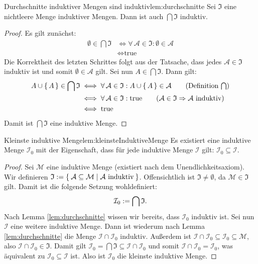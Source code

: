 \documentclass{article}
\begin{document}
\begin{lemma}{Durchschnitte induktiver Mengen sind induktiv}{lem:durchschnitte}
Sei $\mathfrak{I}$ eine nichtleere Menge induktiver Mengen. Dann ist auch
$\bigcap\mathfrak{I}$ induktiv.
\end{lemma}
\begin{proof}
 Es gilt
zun\"achst:
\begin{align*}
    \emptyset \in \bigcap\mathfrak{I}
    & \iff
    \forall\, \mathcal{A} \in \mathfrak{I} : \emptyset \in \mathcal{A}
        \tag{Definition $\bigcap$}\\
    & \iff \text{true}
        \tag{siehe unten}
\end{align*}
Die Korrektheit des letzten Schrittes folgt aus der Tatsache, dass jedes
$\mathcal{A} \in \mathfrak{I}$ induktiv ist und somit $\emptyset \in
\mathcal{A}$ gilt. Sei nun $A \in \bigcap\mathfrak{I}$. Dann gilt:
\begin{align*}
    A \cup \set{A} \in \bigcap\mathfrak{I} 
    & \iff \forall\, \mathcal{A} \in \mathfrak{I}:
                     A \cup \set{A} \in \mathcal{A}
         \tag{Definition $\bigcap$}\\
    & \iff \forall\, \mathcal{A} \in \mathfrak{I}: \text{true}
         \tag{$\mathcal{A} \in \mathfrak{I} \Rightarrow \mathcal{A}$ induktiv}\\
    & \iff \text{true}
\end{align*}
Damit ist $\bigcap\mathfrak{I}$ eine induktive Menge.
\end{proof}


\begin{lemma}{Kleinste induktive Menge}{lem:kleinsteInduktiveMenge}
Es existiert eine induktive Menge $\mathcal{I}_0$ mit der Eigenschaft, dass
f\"ur jede induktive Menge $\mathcal{I}$ gilt:
$\mathcal{I}_0 \subseteq \mathcal{I}$.
\end{lemma}
\begin{proof}
Sei $\mathcal{M}$ eine induktive Menge (existiert nach dem
Unendlichkeitsaxiom). Wir definieren $\mathfrak{I} := \Set{ \mathcal{A}
\subseteq \mathcal{M} | \mathcal{A} \text{ induktiv}}$. Offensichtlich ist
$\mathfrak{I} \neq \emptyset$, da $\mathcal{M} \in \mathfrak{I}$ gilt. Damit
ist die folgende Setzung wohldefiniert:
\[\mathcal{I}_0 := \bigcap \mathfrak{I} \text.\]
Nach Lemma \ref{lem:durchschnitte} wissen wir bereits, dass $\mathcal{I}_0$
induktiv ist. Sei nun $\mathcal{I}$ eine weitere induktive Menge. Dann ist
wiederum nach Lemma \ref{lem:durchschnitte} die Menge $\mathcal{I} \cap
\mathcal{I}_0$ induktiv. Au\ss{}erdem ist $\mathcal{I} \cap
\mathcal{I}_0 \subseteq \mathcal{I}_0 \subseteq \mathcal{M}$, also $\mathcal{I}
\cap \mathcal{I}_0 \in \mathfrak{I}$. Damit gilt $\mathcal{I}_0 =
\bigcap\mathfrak{I} \subseteq \mathcal{I} \cap \mathcal{I}_0$ und somit
$\mathcal{I} \cap \mathcal{I}_0 = \mathcal{I}_0$, was \"aquivalent zu
$\mathcal{I}_0 \subseteq \mathcal{I}$ ist. Also ist $\mathcal{I}_0$ die
kleinste induktive Menge.
\end{proof}
\end{document}
